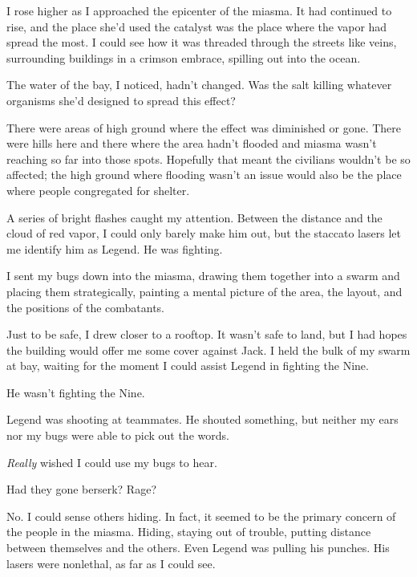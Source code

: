 I rose higher as I approached the epicenter of the miasma.  It had continued to rise, and the place she'd used the catalyst was the place where the vapor had spread the most.  I could see how it was threaded through the streets like veins, surrounding buildings in a crimson embrace, spilling out into the ocean.



The water of the bay, I noticed, hadn't changed.  Was the salt killing whatever organisms she'd designed to spread this effect?



There were areas of high ground where the effect was diminished or gone.  There were hills here and there where the area hadn't flooded and miasma wasn't reaching so far into those spots.  Hopefully that meant the civilians wouldn't be so affected; the high ground where flooding wasn't an issue would also be the place where people congregated for shelter.



A series of bright flashes caught my attention.  Between the distance and the cloud of red vapor, I could only barely make him out, but the staccato lasers let me identify him as Legend.  He was fighting.



I sent my bugs down into the miasma, drawing them together into a swarm and placing them strategically, painting a mental picture of the area, the layout, and the positions of the combatants.



Just to be safe, I drew closer to a rooftop.  It wasn't safe to land, but I had hopes the building would offer me some cover against Jack.  I held the bulk of my swarm at bay, waiting for the moment I could assist Legend in fighting the Nine.



He wasn't fighting the Nine.



Legend was shooting at teammates.  He shouted something, but neither my ears nor my bugs were able to pick out the words.



\emph{Really} wished I could use my bugs to hear.



Had they gone berserk?  Rage?



No.  I could sense others hiding.  In fact, it seemed to be the primary concern of the people in the miasma.  Hiding, staying out of trouble, putting distance between themselves and the others.  Even Legend was pulling his punches.  His lasers were nonlethal, as far as I could see.



